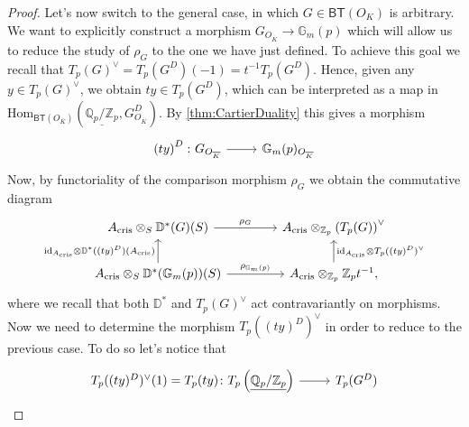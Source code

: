 \begin{proof}
	Let's now switch to the general case, in which $G \in \mathsf{BT}(O_K)$
	is arbitrary.
	We want to explicitly construct a morphism $G_{O_{\overline{K}}} \to \mathbb{G}_m(p)$
	which will allow us to reduce the study of $\rho_G$ to the one we have just defined.
	To achieve this goal we recall that $T_p(G)^\vee = T_p(G^D)(-1) = t^{-1}T_p(G^D)$.
	Hence, given any $y \in T_p(G)^\vee$, we obtain $ty \in T_p(G^D)$,
	which can be interpreted as a map in 
	$\mathrm{Hom}_{ \mathsf{BT}(O_{\overline{K}}) } 
	\left( \underline{\mathbb{Q}_p/\mathbb{Z}_{p}}, G^D_{O_{\overline{K}}}\right)$.
	By \cref{thm:CartierDuality} this gives a morphism
	\begin{equation*}
	\begin{tikzcd}[row sep = 0ex
		,/tikz/column 1/.append style={anchor=base east}
		,/tikz/column 2/.append style={anchor=base west}]
		\left( ty \right)^D\colon G_{O_{\overline{K}}}
		\arrow[r, "", rightarrow] &
		\mathbb{G}_m(p)_{O_{\overline{K}}}
	\end{tikzcd}
	\end{equation*} 
	Now, by functoriality of the comparison morphism $\rho_G$ we obtain the commutative
	diagram
	\begin{equation*}
	\begin{tikzcd}[column sep=4.0em]
		A_{\mathrm{cris}} \otimes_S \mathbb{D}^*(G)(S)
		\arrow[r, "\rho_G", rightarrow] &
		A_{\mathrm{cris}} \otimes_{\mathbb{Z}_{p}} \left( T_p(G) \right)^\vee \\
		A_{\mathrm{cris}} \otimes_S \mathbb{D}^*(\mathbb{G}_m(p))(S)
		\arrow[r, "\rho_{\mathbb{G}_m(p)}", rightarrow] 
		\arrow[u, "\mathrm{id}_{ A_{\mathrm{cris}} } \otimes \mathbb{D}^*((ty)^D)(A_{\mathrm{cris}})", rightarrow] &
		A_{\mathrm{cris}} \otimes_{\mathbb{Z}_{p}} \mathbb{Z}_{p} t^{-1}
		\arrow[u, "\mathrm{id}_{ A_{\mathrm{cris}} } \otimes T_p ((ty)^D)^\vee"', rightarrow] 
	,\end{tikzcd}
	\end{equation*}
	where we recall that both $\mathbb{D}^*$ and $T_p(G)^\vee$ act contravariantly on morphisms.
	Now we need to determine the morphism $T_p((ty)^D)^\vee$ in order to reduce to the previous case.
	To do so let's notice that 
	\begin{equation*}
	\begin{tikzcd}[row sep = 0ex
		,/tikz/column 1/.append style={anchor=base east}
		,/tikz/column 2/.append style={anchor=base west}]
		T_p((ty)^D)^\vee(1) = T_p(ty)\colon 
		T_p \left( \underline{\mathbb{Q}_p/\mathbb{Z}_{p}} \right)
		\arrow[r, "", rightarrow] &
		T_p(G^D)\\

\end{tikzcd}
\end{equation*}
\end{proof}
